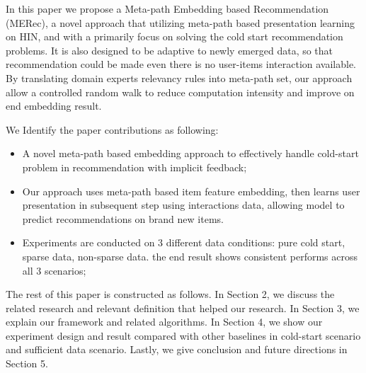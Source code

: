 In this paper we propose a Meta-path Embedding based Recommendation (MERec), a novel approach that utilizing meta-path based presentation learning on HIN, and with a primarily focus on solving the cold start recommendation problems. It is also designed to be adaptive to newly emerged data, so that recommendation could be made even there is no user-items interaction available. By translating domain experts relevancy rules into meta-path set, our approach allow a controlled random walk to reduce computation intensity and improve on end embedding result. 

We Identify the paper contributions as following:
\begin{itemize}
    \item A novel meta-path based embedding approach to effectively handle cold-start problem in  recommendation with implicit feedback;
    \item Our approach uses meta-path based item feature embedding, then learns user presentation in subsequent step using interactions data, allowing model to predict recommendations on brand new items. 
    \item Experiments are conducted on 3 different data conditions: pure cold start, sparse data, non-sparse data. the end result shows consistent performs across all 3 scenarios;
\end{itemize}

The rest of this paper is constructed as follows. In Section 2, we discuss the related research and relevant definition that helped our research. In Section 3, we explain our framework and related algorithms. In Section 4, we show our experiment design and result compared with other baselines in cold-start scenario and sufficient data scenario. Lastly, we give conclusion and future directions in Section 5.